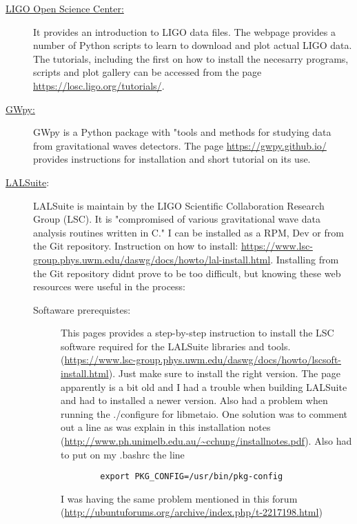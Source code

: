 \documentclass[11pt,fleqn]{book} %
\begin{document}
\begin{description}
	\item[\href{https://losc.ligo.org/tutorials/}{LIGO Open Science Center:}] It provides an introduction to LIGO data files. The webpage provides a number of Python scripts to learn to download and plot actual LIGO data. The tutorials, including the first on how to install the necesarry programs, scripts and plot gallery can be accessed from the page \url{https://losc.ligo.org/tutorials/}.

		\vspace{.3 cm}

\item[\href{https://gwpy.github.io/}{GWpy:}] GWpy is a Python package with "tools and methods for studying data from gravitational waves detectors. The page \url{https://gwpy.github.io/} provides instructions for installation and short tutorial on its use. 

\item[\href{https://www.lsc-group.phys.uwm.edu/daswg/projects/lalsuite.html}{LALSuite}:] LALSuite is maintain by the LIGO Scientific Collaboration Research Group (LSC). It is "compromised of various gravitational wave data analysis routines written in C." I can be installed as a RPM, Dev or from the Git repository. Instruction on how to install: \url{https://www.lsc-group.phys.uwm.edu/daswg/docs/howto/lal-install.html}. Installing from the Git repository didnt prove to be too difficult, but knowing these web resources were useful in the process:
	

	\vspace{.2 cm}
	\begin{description}
		\item[Softaware prerequistes: ] This pages provides a step-by-step instruction to install the LSC software required for the LALSuite libraries and tools. (\url{https://www.lsc-group.phys.uwm.edu/daswg/docs/howto/lscsoft-install.html}). Just make sure to install the right version. The page apparently is a bit old and I had a trouble when building LALSuite and had to installed a newer version. Also had a problem when running the ./configure for libmetaio. One solution was to comment out a line as was explain in this installation notes (\url{http://www.ph.unimelb.edu.au/~cchung/installnotes.pdf}). Also had to put on my .bashrc the line 
			\begin{verbatim}
		export PKG_CONFIG=/usr/bin/pkg-config
		\end{verbatim}
		I was having the same problem mentioned in this forum (\url{http://ubuntuforums.org/archive/index.php/t-2217198.html})\\ 
	\begin{description}
		

\end{description}
\end{description}
\end{description}
\end{document}
